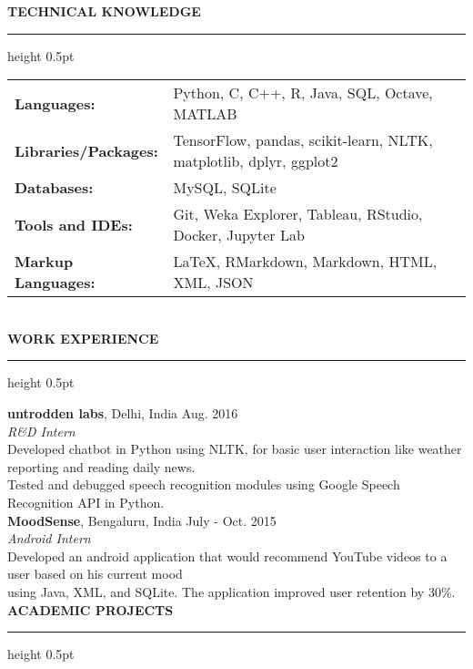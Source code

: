 \documentclass[a4paper]{article}
\newcommand{\myline}{\par
  \kern2pt %
  \hrule height 0.5pt
  \kern2pt %
}
\newcommand{\mybullet}{
	\indent \textbullet \hspace*{2mm}
}
\begin{document}
	\noindent
	{\large \textbf{TECHNICAL KNOWLEDGE}}
	\myline 
	
	\noindent
	\begin{tabular}{ m{3.5cm} l }
		\textbf{Languages: } & Python, C, C++, R, Java, SQL, Octave, MATLAB \\ 
		\textbf{Libraries/Packages: } & TensorFlow, pandas, scikit-learn, NLTK, 
                 matplotlib, dplyr, ggplot2 \\
		\textbf{Databases: } & MySQL, SQLite\\
		\textbf{Tools and IDEs: } & Git, Weka Explorer, Tableau, RStudio, Docker,
                Jupyter Lab\\
		\textbf{Markup Languages: } & LaTeX, RMarkdown, Markdown, HTML, XML, JSON \\
	\end{tabular} \\

	\smallskip
	\smallskip
	\noindent
	{\large \textbf{WORK EXPERIENCE}}
	\myline 
	\smallskip
	
	\noindent
	\textbf{untrodden labs}, Delhi, India \hfill Aug. 2016 \\
        \textit{R\&D Intern}\\
        \mybullet Developed chatbot in Python using NLTK, for basic user interaction like 
        weather reporting and reading daily news. \\
	\mybullet Tested and debugged speech recognition modules using Google Speech 
        Recognition API in Python. \\
	
	\noindent
	\textbf{MoodSense}, Bengaluru, India \hfill July - Oct. 2015 \\
	\textit{Android Intern} \\
	\mybullet Developed an android application that would recommend YouTube videos to a 
        user based on his current mood \\
        \hspace*{9mm} using Java, XML, and SQLite. The 
        application improved user retention by 30\%. \\ 
	
        \noindent
	{\large \textbf{ACADEMIC PROJECTS}}
	\myline 
	\smallskip

\end{document}
